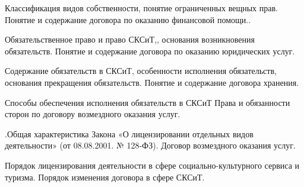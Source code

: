 \documentclass[
	14pt,
	a4paper,
	]
	{scrartcl}
\begin{document}
\vfill

\newpage


\shapk
{}
\setcounter{zad}{0}

\vfill
\z Классификация видов собственности, понятие ограниченных вещных прав.
 \vfill
\z Понятие и содержание договора по оказанию финансовой помощи..
 \vfill

\vfill

\newpage


\shapk
{}
\setcounter{zad}{0}

\vfill
\z Обязательственное  право и право  СКСиТ,, основания  возникновения обязательств.
 \vfill
\z Понятие и содержание договора по оказанию юридических услуг.
 \vfill

\vfill

\newpage


\shapk
{}
\setcounter{zad}{0}

\vfill
\z Содержание обязательств в СКСиТ, особенности исполнения обязательств,  основания прекращения обязательств.
 \vfill
\z Понятие и содержание договора хранения.
 \vfill

\vfill

\newpage


\shapk
{}
\setcounter{zad}{0}

\vfill
\z Способы обеспечения исполнения  обязательств в СКСиТ
 \vfill
\z Права и обязанности сторон по договору возмездного оказания услуг.
 \vfill

\vfill

\newpage


\shapk
{}
\setcounter{zad}{0}

\vfill
\z .Общая характеристика Закона «О лицензировании отдельных видов деятельности» (от 08.08.2001. № 128-ФЗ).
 \vfill
\z Договор возмездного оказания услуг.
 \vfill

\vfill

\newpage


\shapk
{}
\setcounter{zad}{0}

\vfill
\z Порядок лицензирования деятельности в сфере социально-культурного сервиса и туризма. 
 \vfill
\z Порядок изменения договора в сфере СКСиТ.
 \vfill

\vfill

\newpage


\shapk
{}
\setcounter{zad}{0}
\end{document}
